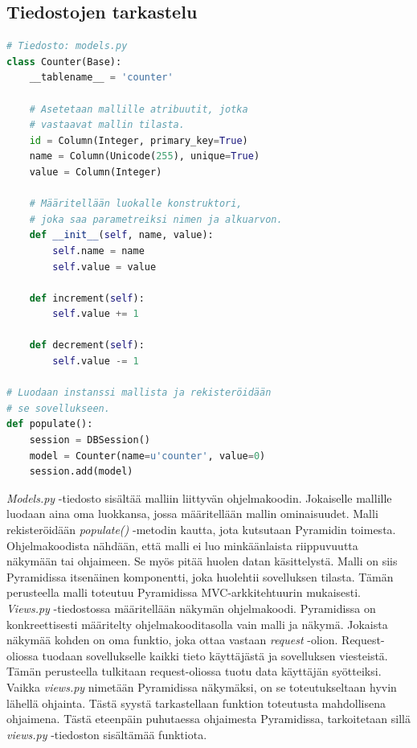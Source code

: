 \documentclass[finnish,utf8,nonumbib,palatino,kandi]{gradu2}
\begin{document}
\subsection{Tiedostojen tarkastelu}
\lstset{numbers=left}
\begin{lstlisting}[language=Python]
# Tiedosto: models.py
class Counter(Base):
    __tablename__ = 'counter'

    # Asetetaan mallille atribuutit, jotka
    # vastaavat mallin tilasta.
    id = Column(Integer, primary_key=True)
    name = Column(Unicode(255), unique=True)
    value = Column(Integer)

    # Määritellään luokalle konstruktori,
    # joka saa parametreiksi nimen ja alkuarvon.
    def __init__(self, name, value):
        self.name = name
        self.value = value

    def increment(self):
        self.value += 1

    def decrement(self):
        self.value -= 1

# Luodaan instanssi mallista ja rekisteröidään 
# se sovellukseen.
def populate():
    session = DBSession()
    model = Counter(name=u'counter', value=0)
    session.add(model)
\end{lstlisting}

\emph{Models.py} -tiedosto sisältää malliin liittyvän ohjelmakoodin. Jokaiselle mallille luodaan aina oma luokkansa, jossa määritellään mallin ominaisuudet. Malli rekisteröidään \emph{populate()} -metodin kautta, jota kutsutaan Pyramidin toimesta.
Ohjelmakoodista nähdään, että malli ei luo minkäänlaista riippuvuutta näkymään tai ohjaimeen. Se myös pitää huolen datan käsittelystä.  Malli on siis Pyramidissa itsenäinen komponentti, joka huolehtii sovelluksen tilasta. Tämän perusteella malli toteutuu Pyramidissa MVC-arkkitehtuurin mukaisesti. \\

\emph{Views.py} -tiedostossa määritellään näkymän ohjelmakoodi. Pyramidissa on konkreettisesti määritelty ohjelmakooditasolla vain malli ja näkymä.
Jokaista näkymää kohden on oma funktio, joka ottaa vastaan \emph{request} -olion. Request-oliossa tuodaan sovellukselle kaikki tieto käyttäjästä ja sovelluksen viesteistä. Tämän perusteella tulkitaan request-oliossa tuotu data käyttäjän syötteiksi.
Vaikka \emph{views.py} nimetään Pyramidissa näkymäksi, on se toteutukseltaan hyvin lähellä ohjainta. Tästä syystä tarkastellaan funktion toteutusta mahdollisena ohjaimena. Tästä eteenpäin puhutaessa ohjaimesta Pyramidissa, tarkoitetaan sillä \emph{views.py} -tiedoston sisältämää funktiota.
\end{document}
